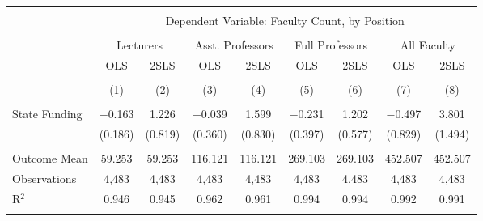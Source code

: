 
\begin{tabular}{@{\extracolsep{5pt}}lcccccccc} 
\\[-1.8ex]\hline 
\hline \\[-1.8ex] 
 & \multicolumn{8}{c}{Dependent Variable: Faculty Count, by Position} \\ 
\cline{2-9} 
\\[-1.8ex] & \multicolumn{2}{c}{Lecturers} & \multicolumn{2}{c}{Asst. Professors} & \multicolumn{2}{c}{Full Professors} & \multicolumn{2}{c}{All Faculty} \\ 
 & OLS & 2SLS & OLS & 2SLS & OLS & 2SLS & OLS & 2SLS \\ 
\\[-1.8ex] & (1) & (2) & (3) & (4) & (5) & (6) & (7) & (8)\\ 
\hline \\[-1.8ex] 
 State Funding & $-$0.163 & 1.226 & $-$0.039 & 1.599 & $-$0.231 & 1.202 & $-$0.497 & 3.801 \\ 
  & (0.186) & (0.819) & (0.360) & (0.830) & (0.397) & (0.577) & (0.829) & (1.494) \\ 
 \hline \\[-1.8ex] 
Outcome Mean & 59.253 & 59.253 & 116.121 & 116.121 & 269.103 & 269.103 & 452.507 & 452.507 \\ 
Observations & 4,483 & 4,483 & 4,483 & 4,483 & 4,483 & 4,483 & 4,483 & 4,483 \\ 
R$^{2}$ & 0.946 & 0.945 & 0.962 & 0.961 & 0.994 & 0.994 & 0.992 & 0.991 \\ 
\hline 
\hline \\[-1.8ex] 
\end{tabular} 

